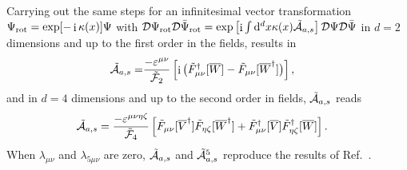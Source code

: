 \documentclass[prl,aps,showpacs,twocolumn,preprintnumbers,
amsmath,amssymb,superscriptaddress,longbibliography]{revtex4-1}
\renewcommand{\i}{\mathop{\mathrm{i}}}
\begin{document}
 Carrying out the same steps for an infinitesimal vector transformation $\Psi_{\rm rot} = \exp[-\i \kappa(x)] \Psi$ with $  {\cal D} \Psi_{\rm rot} {\cal D}\bar{\Psi}_{\rm rot}
 =\exp \left[ {\i \int {\rm d}^{d} x \kappa(x) \tilde{\cal A}_{a,s}} \right] {\cal D} \Psi {\cal D}\bar{\Psi}$ in $d=2$ dimensions and up to the first order in the fields, results in
   \begin{align}
 \tilde{\cal A}_{a,s}= & \frac{-\varepsilon^{\mu \nu} }{\tilde{\cal F}_{2}} 
     \left[ 
 \i \big( 
 \tilde{F}^{\dagger}_{\mu \nu} [\overline{W}]
  -  \tilde{F}_{\mu \nu} [\overline{W}^{\dagger}]
      \big)
 \right]
    ,\label{eq:A_1p1_mt_Vbar}
 \end{align}
 and in $d=4$ dimensions and up to the second order in fields, $ \tilde{\cal A}_{a,s}$ reads
 \begin{align}
\tilde{\cal A}_{a,s} 
 &=
  \frac{- \varepsilon^{\mu \nu \eta \zeta} }{\tilde{\cal F}_{4}} 
   \left[ 
 \tilde{F}_{\mu \nu}[ \overline{V}^{\dagger}] 
 \tilde{F}_{\eta \zeta} [\overline{W}^{\dagger}]
+
\tilde{F}^{\dagger}_{\mu \nu}[ \overline{V}]  
 \tilde{F}^{\dagger}_{\eta \zeta} [\overline{W}] 
 \right].\label{eq:A_3p1}
 \end{align}
When $\lambda_{\mu \nu} $ and $ \lambda_{5 \mu \nu}$ are zero, $\tilde{\cal A}_{a,s}$ and $\tilde{\cal A}_{a,s}^{5}$ reproduce the results of Ref.~\cite{Sayyad2022ca}.
\end{document}
